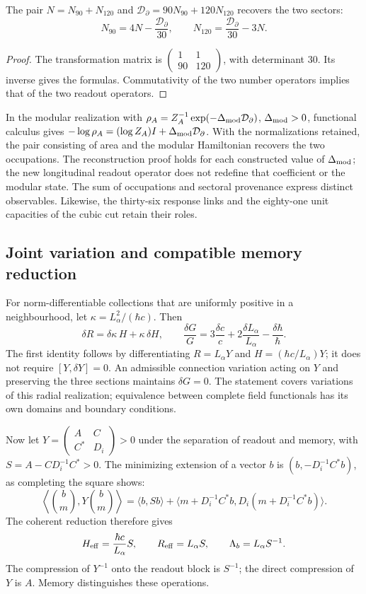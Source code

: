\begin{proposition}
The pair
$N=N_{90}+N_{120}$ and $\mathcal D_{\partial}=90N_{90}+120N_{120}$
recovers the two sectors:
\[
 N_{90}=4N-\frac{\mathcal D_{\partial}}{30},\qquad
 N_{120}=\frac{\mathcal D_{\partial}}{30}-3N.
\]
\end{proposition}
\begin{proof}
The transformation matrix is
$\left(\begin{smallmatrix}1&1\\90&120\end{smallmatrix}\right)$,
with determinant $30$. Its inverse gives the formulas. Commutativity
of the two number operators implies that of the two readout operators.
\end{proof}
In the modular realization with
$\rho_A=Z_A^{-1}\exp(-\Delta_{\rm mod}\mathcal D_{\partial})$,
$\Delta_{\rm mod}>0$, functional calculus gives
$-\log\rho_A=(\log Z_A)I+\Delta_{\rm mod}\mathcal D_{\partial}$.
With the normalizations retained, the pair consisting of area and
the modular Hamiltonian recovers the two occupations. The reconstruction
proof holds for each constructed value of $\Delta_{\rm mod}$; the new
longitudinal readout operator does not redefine that coefficient or
the modular state. The sum of occupations and sectoral provenance
express distinct observables. Likewise, the thirty-six response links
and the eighty-one unit capacities of the cubic cut retain their roles.

\subsection{Joint variation and compatible memory reduction}
\label{md:rigidez:variaciones}

For norm-differentiable collections that are uniformly positive in a
neighbourhood, let $\kappa=L_\alpha^2/(\hbar c)$. Then
\[
 \delta R=\delta\kappa\,H+\kappa\,\delta H,\qquad
 \frac{\delta G}{G}=3\frac{\delta c}{c}
 +2\frac{\delta L_\alpha}{L_\alpha}-\frac{\delta\hbar}{\hbar}.
\]
The first identity follows by differentiating
$R=L_\alpha Y$ and $H=(\hbar c/L_\alpha)Y$; it does not require
$[Y,\delta Y]=0$. An admissible connection variation acting on $Y$
and preserving the three sections maintains $\delta G=0$.
The statement covers variations of this radial realization;
equivalence between complete field functionals has its own domains
and boundary conditions.

Now let
$Y=\left(\begin{smallmatrix}A&C\\C^*&D_i\end{smallmatrix}\right)>0$
under the separation of readout and memory, with
$S=A-CD_i^{-1}C^*>0$. The minimizing extension of a vector $b$ is
$(b,-D_i^{-1}C^*b)$, as completing the square shows:
\[
 \left\langle\binom b m,Y\binom b m\right\rangle
 =\langle b,Sb\rangle+
 \langle m+D_i^{-1}C^*b,D_i(m+D_i^{-1}C^*b)\rangle.
\]
The coherent reduction therefore gives
\[
 H_{\rm eff}=\frac{\hbar c}{L_\alpha}S,\qquad
 R_{\rm eff}=L_\alpha S,\qquad\Lambda_b=L_\alpha S^{-1}.
\]
The compression of $Y^{-1}$ onto the readout block is $S^{-1}$;
the direct compression of $Y$ is $A$. Memory distinguishes these operations.

